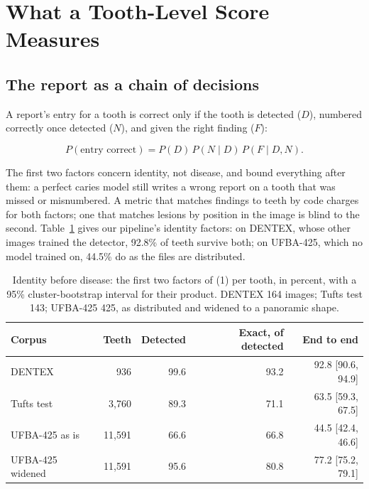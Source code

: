 \documentclass[conference]{IEEEtran}
\begin{document}
\section{What a Tooth-Level Score Measures}

\subsection{The report as a chain of decisions}

A report's entry for a tooth is correct only if the tooth is detected ($D$), numbered correctly once detected ($N$), and given the right finding ($F$):

\begin{equation}
P(\text{entry correct}) = P(D)\, P(N \mid D)\, P(F \mid D, N).
\end{equation}

The first two factors concern identity, not disease, and bound everything after them: a perfect caries model still writes a wrong report on a tooth that was missed or misnumbered. A metric that matches findings to teeth by code charges for both factors; one that matches lesions by position in the image is blind to the second. Table~\ref{tab:1} gives our pipeline's identity factors: on DENTEX, whose other images trained the detector, 92.8\% of teeth survive both; on UFBA-425, which no model trained on, 44.5\% do as the files are distributed.

\begin{table}[t]
\centering
\caption{Identity before disease: the first two factors of (1) per tooth, in percent, with a 95\% cluster-bootstrap interval for their product. DENTEX 164 images; Tufts test 143; UFBA-425 425, as distributed and widened to a panoramic shape.}
\label{tab:1}
\footnotesize
\setlength{\tabcolsep}{3pt}
\begin{tabular}{>{\raggedright\arraybackslash}p{1.65cm}rrrr}
\toprule
Corpus & Teeth & Detected & Exact, of detected & End to end \\
\midrule
DENTEX & 936 & 99.6 & 93.2 & 92.8 [90.6, 94.9] \\
Tufts test & 3,760 & 89.3 & 71.1 & 63.5 [59.3, 67.5] \\
UFBA-425 as is & 11,591 & 66.6 & 66.8 & 44.5 [42.4, 46.6] \\
UFBA-425 widened & 11,591 & 95.6 & 80.8 & 77.2 [75.2, 79.1] \\
\bottomrule
\end{tabular}
\end{table}
\end{document}
